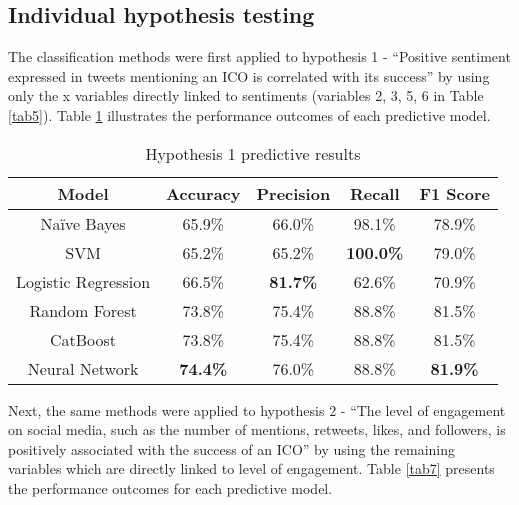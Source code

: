 \documentclass[runningheads]{llncs}
\begin{document}
\subsection{Individual hypothesis testing}
The classification methods were first applied to hypothesis 1 - ``Positive sentiment expressed in tweets mentioning an ICO is correlated with its success'' by using only the x variables directly linked to sentiments (variables 2, 3, 5, 6 in Table \ref{tab5}). Table \ref{tab6} illustrates the performance outcomes of each predictive model. 


\begin{table}[htbp]
\caption{Hypothesis 1 predictive results}
\begin{center}
\begin{tabular}{|c|c|c|c|c|}
\hline
\textbf{Model} & \textbf{Accuracy} & \textbf{Precision} & \textbf{Recall} & \textbf{F1 Score} \\
\hline
Naïve Bayes & 65.9\% & 66.0\% & 98.1\% & 78.9\% \\
\hline
SVM & 65.2\% & 65.2\% & \textbf{100.0\%} & 79.0\% \\
\hline
Logistic Regression & 66.5\% & \textbf{81.7\%} & 62.6\% & 70.9\% \\
\hline
Random Forest & 73.8\% & 75.4\% & 88.8\% & 81.5\% \\
\hline
CatBoost & 73.8\% & 75.4\% & 88.8\% & 81.5\% \\
\hline
Neural Network & \textbf{74.4\%} & 76.0\% & 88.8\% & \textbf{81.9\%} \\
\hline
\end{tabular}
\label{tab6}
\end{center}
\end{table}


Next, the same methods were applied to hypothesis 2 - ``The level of engagement on social media, such as the number of mentions, retweets, likes, and followers, is positively associated with the success of an ICO'' by using the remaining variables which are directly linked to level of engagement. Table \ref{tab7} presents the performance outcomes for each predictive model.
\end{document}
